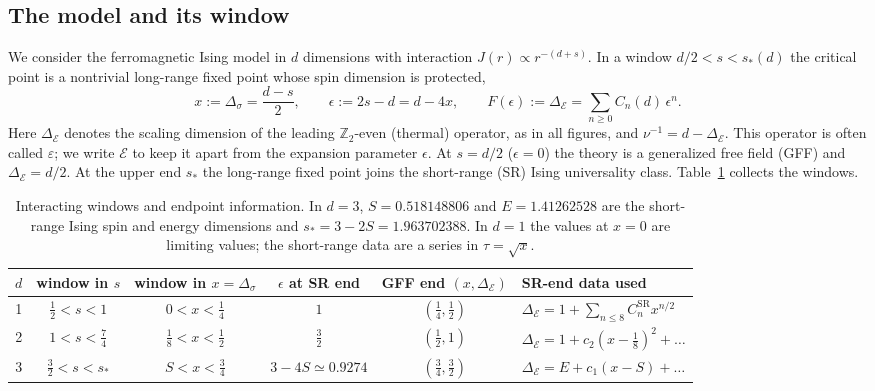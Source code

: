 \documentclass[11pt,a4paper]{article}
\numberwithin{equation}{section}
\newcommand{\De}{\Delta_{\mathcal E}}   %
\newcommand{\Ds}{\Delta_\sigma}
\newcommand{\CSR}{C^{\mathrm{SR}}}
\begin{document}
\subsection{The model and its window}
We consider the ferromagnetic Ising model in $d$ dimensions with interaction
$J(r)\propto r^{-(d+s)}$. In a window $d/2<s<s_*(d)$ the critical point is a
nontrivial long-range fixed point whose spin dimension is protected,
\begin{equation}
 x:=\Ds=\frac{d-s}{2},\qquad
 \epsilon:=2s-d=d-4x,\qquad
 F(\epsilon):=\De=\sum_{n\ge0}C_n(d)\,\epsilon^n .
 \label{eq:conventions}
\end{equation}
Here $\De$ denotes the scaling dimension of the leading $\mathbb Z_2$-even (thermal)
operator, as in all figures, and $\nu^{-1}=d-\De$. This operator is often called
$\varepsilon$; we write $\mathcal E$ to keep it apart from the expansion parameter $\epsilon$.
At $s=d/2$ ($\epsilon=0$) the theory
is a generalized free field (GFF) and $\De=d/2$. At the upper end $s_*$ the long-range
fixed point joins the short-range (SR) Ising universality class. Table~\ref{tab:windows}
collects the windows.

\begin{table}[htbp]\centering\small\setlength{\tabcolsep}{4pt}
\begin{tabular}{@{}c c c c c l@{}}
\toprule
$d$ & window in $s$ & window in $x=\Ds$ & $\epsilon$ at SR end & GFF end $(x,\De)$ & SR-end data used\\ \midrule
1 & $\tfrac12<s<1$ & $0<x<\tfrac14$ & $1$ & $(\tfrac14,\tfrac12)$ & $\De=1+\sum_{n\le8}\CSR_n x^{n/2}$\\
2 & $1<s<\tfrac74$ & $\tfrac18<x<\tfrac12$ & $\tfrac32$ & $(\tfrac12,1)$ & $\De=1+c_2(x-\tfrac18)^2+\dots$\\
3 & $\tfrac32<s<s_*$ & $S<x<\tfrac34$ & $3-4S\simeq0.9274$ & $(\tfrac34,\tfrac32)$ & $\De=E+c_1(x-S)+\dots$\\
\bottomrule
\end{tabular}
\caption{Interacting windows and endpoint information. In $d=3$,
$S=0.518148806$ and $E=1.41262528$ are the short-range Ising spin and energy
dimensions and $s_*=3-2S=1.963702388$. In $d=1$ the values at $x=0$ are limiting
values; the short-range data are a series in $\tau=\sqrt x$.}
\label{tab:windows}
\end{table}
\end{document}
